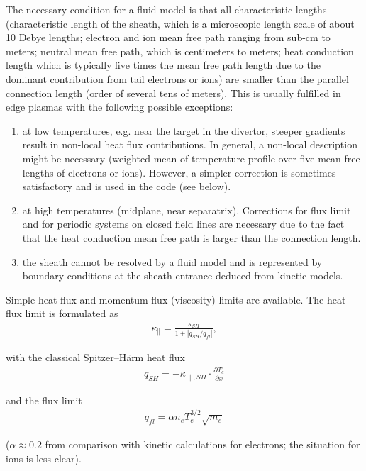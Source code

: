 \documentclass[a4paper,10pt]{report}
\begin{document}
The necessary condition for a fluid model is
that all characteristic lengths (characteristic length
of the sheath, which is a microscopic length scale of about 10 Debye lengths;
electron and ion mean free path ranging from sub-cm to meters; neutral mean
free path, which is centimeters to meters; heat conduction length which is typically
five times the mean free path length due to the dominant contribution from tail
electrons or ions)
are smaller than the parallel connection length (order of several tens of meters). This
is usually fulfilled in edge plasmas with the following possible exceptions:
\begin{enumerate}
  \item at low temperatures, e.g.
           near the target in the divertor,
           steeper gradients result in non-local heat flux contributions. In general,
           a non-local description might be necessary
            (weighted mean of temperature profile over
           five mean free lengths of electrons or ions). However, a simpler correction
           is sometimes satisfactory and is used in the code (see below).
  \item at high temperatures
        (midplane, near separatrix).
        Corrections for flux limit and for periodic systems on closed
        field lines are necessary due to the fact that the heat conduction
        mean free path is larger than the connection length.
  \item the sheath cannot be resolved by a fluid model and is represented
        by boundary conditions at the sheath entrance deduced from kinetic
        models.
\end{enumerate}

Simple heat flux and momentum flux (viscosity)
limits are available.
The heat flux limit is formulated as
\begin{gather}
  \kappa _{\parallel}=\frac{\kappa _{SH}}{1+|q_{SH}/q_{fl}|},
\end{gather}

with the classical Spitzer--H\"arm heat flux
\begin{gather}
 q_{SH}=-\kappa _{\parallel ,SH} \cdot \frac{\partial T_e}{\partial x}
\end{gather}

and the flux limit
\begin{gather}
 q_{fl}=\alpha n_e T_e^{3/2} \sqrt{m_e }
\end{gather}

($\alpha \approx 0.2$ from comparison with kinetic calculations for electrons;
the situation for ions is less clear).
\end{document}
